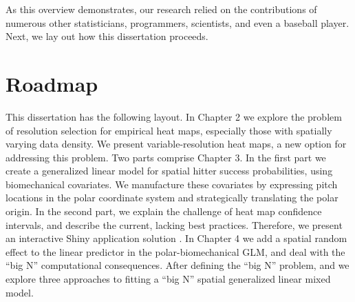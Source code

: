 As this overview demonstrates, our research relied on the contributions of numerous other statisticians, programmers, scientists, and even a baseball player. Next, we lay out how this dissertation proceeds.

\section{Roadmap}

This dissertation has the following layout. In Chapter 2 we explore the problem of resolution selection for empirical heat maps, especially those with spatially varying data density. We present variable-resolution heat maps, a new option for addressing this problem. Two parts comprise Chapter 3. In the first part we create a generalized linear model for spatial hitter success probabilities, using biomechanical covariates. We manufacture these covariates by expressing pitch locations in the polar coordinate system and strategically translating the polar origin. In the second part, we explain the challenge of heat map confidence intervals, and describe the current, lacking best practices. Therefore, we present an interactive Shiny application solution \citep{Shiny}. In Chapter 4 we add a spatial random effect to the linear predictor in the polar-biomechanical GLM, and deal with the ``big N'' computational consequences. After defining the ``big N'' problem, and we explore three approaches to fitting a ``big N'' spatial generalized linear mixed model. 

